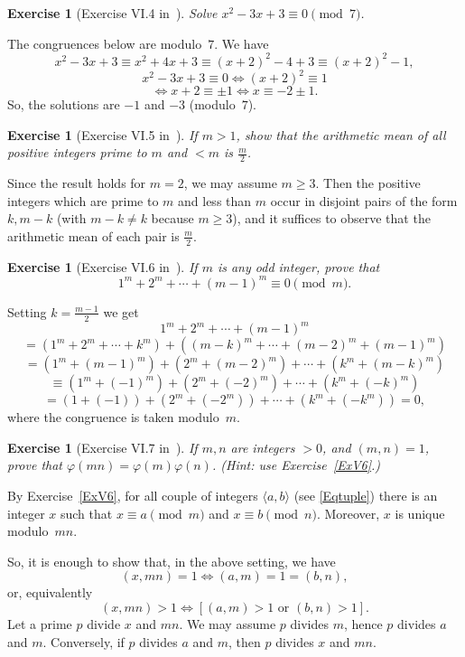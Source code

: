 \documentclass[12pt,letterpaper]{article}
\newtheorem{exer}[thm]{Exercise}
\theoremstyle{definition}
\begin{document}
\begin{exer}[Exercise VI.4 in~\cite{weil1979}]
Solve $x^2-3x+3\equiv 0\pmod 7$.
\end{exer}

The congruences below are modulo~$7$. We have 
$$
x^2-3x+3\equiv x^2+4x+3 \equiv (x+2)^2-4+3 \equiv (x+2)^2-1, %
$$ 
$$
x^2-3x+3\equiv 0 \iff (x+2)^2 \equiv 1 
$$ 
$$
\iff x+2 \equiv \pm 1 \iff x \equiv -2\pm 1.
$$ 
So, the solutions are $-1$ and $-3$ (modulo~$7$). 

\begin{exer}[Exercise VI.5 in~\cite{weil1979}]
If $m>1$, show that the arithmetic mean of all positive integers prime to $m$ and $<m$ is $\frac{m}{2}$.
\end{exer}

Since the result holds for $m=2$, we may assume $m \ge 3$. Then the positive integers which are prime to $m$ and less than $m$ occur in disjoint pairs of the form $k, m-k$ (with $m-k \ne k$ because $m \ge 3$), and it suffices to observe that the arithmetic mean of each pair is $\frac{m}{2}$. 

\begin{exer}[Exercise VI.6 in~\cite{weil1979}]
If $m$ is any odd integer, prove that
\[
1^m+2^m+\cdots+(m-1)^m\equiv 0\pmod m.
\]
\end{exer} 

Setting $k=\frac{m-1}{2}$ we get 
$$
1^m+2^m+\cdots+(m-1)^m
$$ 
$$
=(1^m+2^m+\cdots+k^m)+((m-k)^m+\cdots+(m-2)^m+(m-1)^m)
$$ 
$$
= (1^m + (m-1)^m) + (2^m + (m-2)^m) + \cdots + (k^m + (m-k)^m)
$$ 
$$
\equiv (1^m + (-1)^m) + (2^m + (-2)^m) + \cdots + (k^m + (-k)^m)
$$ 
$$
= (1 + (-1)) + (2^m + (-2^m)) + \cdots + (k^m + (-k^m)) = 0,
$$ 
where the congruence is taken modulo~$m$. 

\begin{exer}[Exercise VI.7 in~\cite{weil1979}]
If $m,n$ are integers $>0$, and $(m,n)=1$, prove that $\varphi(mn)=\varphi(m)\varphi(n)$. (Hint: use Exercise~\ref{ExV6}.) 
\end{exer}

By Exercise~\ref{ExV6}, for all couple of integers $\langle a,b\rangle$ (see \eqref{Eqtuple}) there is an integer $x$ such that $x \equiv a \pmod{m}$ and $x \equiv b \pmod{n}$. Moreover, $x$ is unique modulo~$mn$. 

So, it is enough to show that, in the above setting, we have 
$$
(x,mn)=1 \iff (a,m)=1=(b,n),
$$ 
or, equivalently 
$$
(x,mn)>1 \iff [(a,m)>1 \text{ or }(b,n)>1].
$$ 
Let a prime $p$ divide $x$ and $mn$. We may assume $p$ divides $m$, hence $p$ divides $a$ and $m$. Conversely, if $p$ divides $a$ and $m$, then $p$ divides $x$ and $mn$. 
\end{document}
